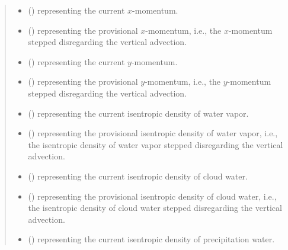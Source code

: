 \documentclass[letterpaper,10pt,english]{sphinxmanual}
\begin{document}
\begin{fulllineitems}
\begin{fulllineitems}
\begin{quote}
\begin{description}
\begin{itemize}
\item {} 
 () \textendash{}  representing the current \(x\)-momentum.

\item {} 
 () \textendash{}  representing the provisional \(x\)-momentum, i.e., the \(x\)-momentum stepped
disregarding the vertical advection.

\item {} 
 () \textendash{}  representing the current \(y\)-momentum.

\item {} 
 () \textendash{}  representing the provisional \(y\)-momentum, i.e., the \(y\)-momentum stepped
disregarding the vertical advection.

\item {} 
 () \textendash{}  representing the current isentropic density of water vapor.

\item {} 
 () \textendash{}  representing the provisional isentropic density of water vapor,
i.e., the isentropic density of water vapor stepped disregarding the vertical advection.

\item {} 
 () \textendash{}  representing the current isentropic density of cloud water.

\item {} 
 () \textendash{}  representing the provisional isentropic density of cloud water,
i.e., the isentropic density of cloud water stepped disregarding the vertical advection.

\item {} 
 () \textendash{}  representing the current isentropic density of precipitation water.


\end{itemize}
\end{description}
\end{quote}
\end{fulllineitems}
\end{fulllineitems}
\end{document}
